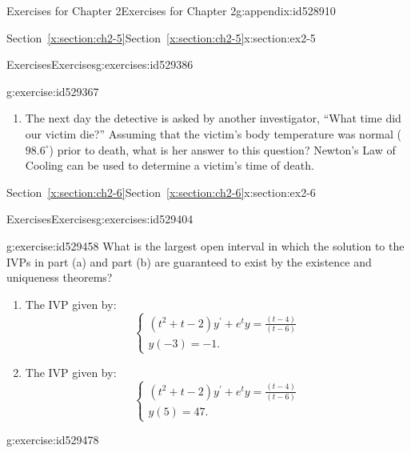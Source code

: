 \documentclass[oneside,10pt,]{book}
\newcommand{\xreffont}{\relax}
\numberwithin{equation}{section}
\numberwithin{equation}{section}
\begin{document}
\begin{appendixptx}{Exercises for Chapter 2}{}{Exercises for Chapter 2}{}{}{g:appendix:id528910}
\begin{sectionptx}{Section~{\xreffont\ref*{x:section:ch2-5}}}{}{Section~{\xreffont\ref*{x:section:ch2-5}}}{}{}{x:section:ex2-5}
\begin{exercises-subsection-numberless}{Exercises}{}{Exercises}{}{}{g:exercises:id529386}
\begin{divisionexercise}{1}{}{}{g:exercise:id529367}
\begin{enumerate}[label=(\alph*)]
\item{}The next day the detective is asked by another investigator, ``What time did our victim die?'' Assuming that the victim's body temperature was normal (\(98.6^{\circ}\)) prior to death, what is her answer to this question? Newton's Law of Cooling can be used to determine a victim's time of death.%
\end{enumerate}
%
\end{divisionexercise}%
\end{exercises-subsection-numberless}
\end{sectionptx}
%
%
\typeout{************************************************}
\typeout{Section C.6 Section~{\xreffont\ref*{x:section:ch2-6}}}
\typeout{************************************************}
%
\begin{sectionptx}{Section~{\xreffont\ref*{x:section:ch2-6}}}{}{Section~{\xreffont\ref*{x:section:ch2-6}}}{}{}{x:section:ex2-6}
%
%
\typeout{************************************************}
\typeout{************************************************}
%
\begin{exercises-subsection-numberless}{Exercises}{}{Exercises}{}{}{g:exercises:id529404}
\begin{divisionexercise}{1}{}{}{g:exercise:id529458}%
What is the largest open interval in which the solution to the IVPs in part (a) and part (b) are guaranteed to exist by the existence and uniqueness theorems?%
\begin{enumerate}[label=(\alph*)]
\item{}The IVP given by:%
\begin{equation*}
\begin{cases}
\left(t^{2}+t-2\right)y^{\prime}+e^{t}y=\frac{\left(t-4\right)}{\left(t-6\right)}\\
y(-3)=-1.
\end{cases}
\end{equation*}
%
\item{}The IVP given by:%
\begin{equation*}
\begin{cases}
\left(t^{2}+t-2\right)y^{\prime}+e^{t}y=\frac{\left(t-4\right)}{\left(t-6\right)}\\
y(5)=47.
\end{cases}
\end{equation*}
%
\end{enumerate}
%
\end{divisionexercise}%
\begin{divisionexercise}{2}{}{}{g:exercise:id529478}%

\end{divisionexercise}
\end{exercises-subsection-numberless}
\end{sectionptx}
\end{appendixptx}
\end{document}
